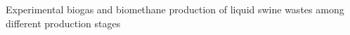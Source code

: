 Experimental biogas and biomethane production of liquid swine wastes among different production stages